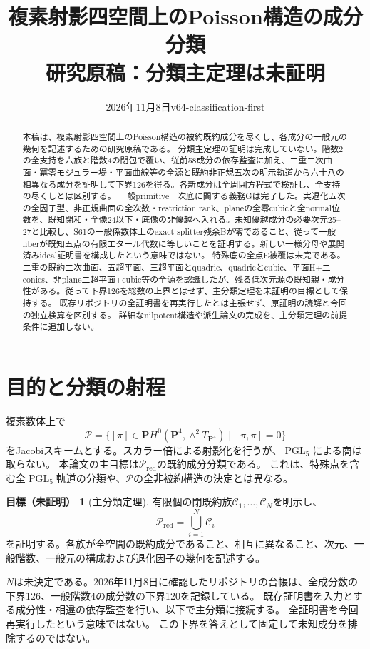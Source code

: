 \documentclass[a4paper,11pt]{ltjsarticle}
\title{複素射影四空間上のPoisson構造の成分分類\\[3pt]
\large 研究原稿：分類主定理は未証明}
\author{}
\date{2026年11月8日\quad v64-classification-first}
\theoremstyle{definition}
\newtheorem{target}[proposition]{目標（未証明）}
\newcommand{\PP}{\mathbf P}
\newcommand{\red}{\mathrm{red}}
\newcommand{\PGL}{\operatorname{PGL}}
\begin{document}
\maketitle
\begin{abstract}
本稿は、複素射影四空間上のPoisson構造の被約既約成分を尽くし、各成分の一般元の幾何を記述するための研究原稿である。
分類主定理の証明は完成していない。階数2の全支持を六族と階数4の閉包で覆い、従前58成分の依存監査に加え、二重二次曲面・冪零モジュラー場・平面曲線等の全源と既約非正規五次の明示軌道から六十八の相異なる成分を証明して下界126を得る。各新成分は全周囲方程式で検証し、全支持の尽くしとは区別する。
一般primitive一次底に関する義務Gは完了した。実退化五次の全因子型、非正規曲面の全次数・restriction rank、planeの全零cubicと全normal位数を、既知閉和・全像24以下・底像の非優越へ入れる。未知優越成分の必要次元25--27と比較し、S61の一般係数体上のexact splitter残余Bが零であること、従って一般fiberが既知五点の有限エタール代数に等しいことを証明する。新しい一様分母や展開済みideal証明書を構成したという意味ではない。
特殊底の全点E被覆は未完である。二重の既約二次曲面、五超平面、三超平面とquadric、quadricとcubic、平面H+二conics、非plane二超平面+cubic等の全源を認識したが、残る低次元源の既知親・成分性がある。従って下界126を総数の上界とはせず、主分類定理を未証明の目標として保持する。
既存リポジトリの全証明書を再実行したとは主張せず、原証明の読解と今回の独立検算を区別する。
詳細なnilpotent構造や派生論文の完成を、主分類定理の前提条件に追加しない。
\end{abstract}

\section{目的と分類の射程}
複素数体上で
\[
 \mathcal P=\{[\pi]\in\PP H^0(\PP^4,\wedge^2T_{\PP^4})\mid[\pi,\pi]=0\}
\]
をJacobiスキームとする。スカラー倍による射影化を行うが、\(\PGL_5\)による商は取らない。
本論文の主目標は\(\mathcal P_{\red}\)の既約成分分類である。
これは、特殊点を含む全\(\PGL_5\)軌道の分類や、\(\mathcal P\)の全非被約構造の決定とは異なる。

\begin{target}[主分類定理]\label{target:main}
有限個の閉既約族\(\mathcal C_1,\ldots,\mathcal C_N\)を明示し、
\[
 \mathcal P_{\red}=\bigcup_{i=1}^{N}\mathcal C_i
\]
を証明する。各族が全空間の既約成分であること、相互に異なること、次元、一般階数、一般元の構成および退化因子の幾何を記述する。
\end{target}

\(N\)は未決定である。2026年11月8日に確認したリポジトリの台帳は、全成分数の下界126、一般階数4の成分数の下界120を記録している。
既存証明書を入力とする成分性・相違の依存監査を行い、以下で主分類に接続する。
全証明書を今回再実行したという意味ではない。
この下界を答えとして固定して未知成分を排除するのではない。
\end{document}

